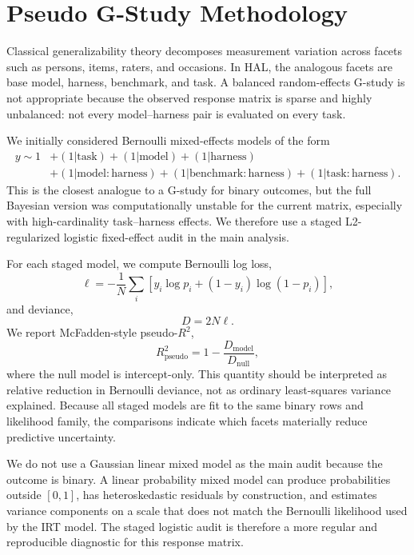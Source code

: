 \section{Pseudo G-Study Methodology}
\label{app:pseudo-gstudy}

Classical generalizability theory decomposes measurement variation across facets such as persons, items, raters, and occasions. In HAL, the analogous facets are base model, harness, benchmark, and task. A balanced random-effects G-study is not appropriate because the observed response matrix is sparse and highly unbalanced: not every model--harness pair is evaluated on every task.

We initially considered Bernoulli mixed-effects models of the form
\[
\begin{aligned}
y \sim 1
    &+ (1|\text{task}) + (1|\text{model}) + (1|\text{harness})\\
    &+ (1|\text{model}:\text{harness})
     + (1|\text{benchmark}:\text{harness})
     + (1|\text{task}:\text{harness}).
\end{aligned}
\]
This is the closest analogue to a G-study for binary outcomes, but the full Bayesian version was computationally unstable for the current matrix, especially with high-cardinality task--harness effects. We therefore use a staged L2-regularized logistic fixed-effect audit in the main analysis.

For each staged model, we compute Bernoulli log loss,
\[
\ell = -\frac{1}{N}\sum_i \left[y_i\log p_i + (1-y_i)\log(1-p_i)\right],
\]
and deviance,
\[
D = 2N\ell.
\]
We report McFadden-style pseudo-$R^2$,
\[
R^2_{\mathrm{pseudo}} = 1 - \frac{D_{\mathrm{model}}}{D_{\mathrm{null}}},
\]
where the null model is intercept-only. This quantity should be interpreted as relative reduction in Bernoulli deviance, not as ordinary least-squares variance explained. Because all staged models are fit to the same binary rows and likelihood family, the comparisons indicate which facets materially reduce predictive uncertainty.

We do not use a Gaussian linear mixed model as the main audit because the outcome is binary. A linear probability mixed model can produce probabilities outside $[0,1]$, has heteroskedastic residuals by construction, and estimates variance components on a scale that does not match the Bernoulli likelihood used by the IRT model. The staged logistic audit is therefore a more regular and reproducible diagnostic for this response matrix.
